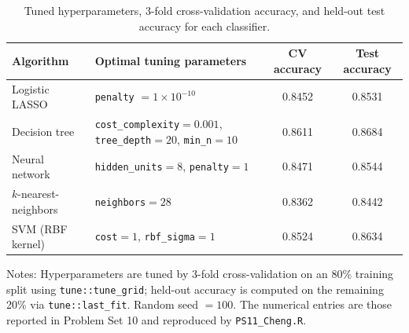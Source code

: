 \documentclass[12pt,english]{article}
\begin{document}
\begin{table}[ht]
\caption{Tuned hyperparameters, 3-fold cross-validation accuracy, and
held-out test accuracy for each classifier.}
\label{tab:results}
\centering
\begin{threeparttable}
\begin{tabular}{lp{6.4cm}cc}
\toprule
Algorithm                & Optimal tuning parameters
                         & CV accuracy & Test accuracy \\
\midrule
Logistic LASSO           & \texttt{penalty} $= 1\times 10^{-10}$
                         & 0.8452 & 0.8531 \\
Decision tree            & \texttt{cost\_complexity}$=0.001$,
                           \texttt{tree\_depth}$=20$,
                           \texttt{min\_n}$=10$
                         & 0.8611 & 0.8684 \\
Neural network           & \texttt{hidden\_units}$=8$,
                           \texttt{penalty}$=1$
                         & 0.8471 & 0.8544 \\
$k$-nearest-neighbors    & \texttt{neighbors}$=28$
                         & 0.8362 & 0.8442 \\
SVM (RBF kernel)         & \texttt{cost}$=1$,
                           \texttt{rbf\_sigma}$=1$
                         & 0.8524 & 0.8634 \\
\bottomrule
\end{tabular}
\footnotesize Notes: Hyperparameters are tuned by 3-fold cross-validation
on an 80\% training split using \texttt{tune::tune\_grid}; held-out
accuracy is computed on the remaining 20\% via
\texttt{tune::last\_fit}. Random seed $=100$. The numerical entries are
those reported in Problem Set 10 and reproduced by
\texttt{PS11\_Cheng.R}.
\end{threeparttable}
\end{table}
\end{document}
